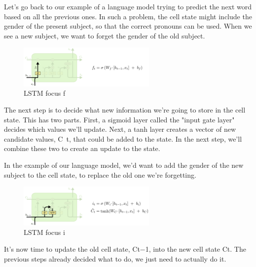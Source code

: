 {Let’s go back to our example of a language model trying to predict the next word based on all the previous ones. In such a problem, the cell state might include the gender of the present subject, so that the correct pronouns can be used. When we see a new subject, we want to forget the gender of the old subject.
\renewcommand{\figurename}{Abb.}
\begin{figure}[htp]
\centering
\includegraphics[width=0.60\textwidth]{pictures/LSTM3-focus-f.png}
\caption[LSTM focus f]{LSTM focus f\protect\footnotemark}
\end{figure}
The next step is to decide what new information we’re going to store in the cell state. This has two parts. First, a sigmoid layer called the "input gate layer" decides which values we’ll update. Next, a tanh layer creates a vector of new candidate values, C~t, that could be added to the state. In the next step, we’ll combine these two to create an update to the state.

In the example of our language model, we’d want to add the gender of the new subject to the cell state, to replace the old one we’re forgetting.
\renewcommand{\figurename}{Abb.}
\begin{figure}[htp]
\centering
\includegraphics[width=0.60\textwidth]{pictures/LSTM3-focus-i.png}
\caption[LSTM focus i]{LSTM focus i\protect\footnotemark}
\end{figure}
It’s now time to update the old cell state, Ct−1, into the new cell state Ct. The previous steps already decided what to do, we just need to actually do it.

}
